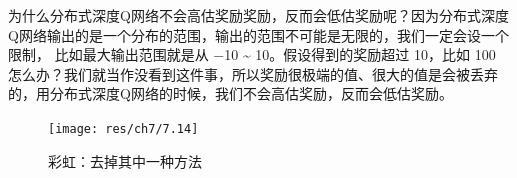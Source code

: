为什么分布式深度Q网络不会高估奖励奖励，反而会低估奖励呢？因为分布式深度Q网络输出的是一个分布的范围，输出的范围不可能是无限的，我们一定会设一个限制， 比如最大输出范围就是从 $-$10 \~{} 10。假设得到的奖励超过 10，比如 100 怎么办？我们就当作没看到这件事，所以奖励很极端的值、很大的值是会被丢弃的，用分布式深度Q网络的时候，我们不会高估奖励，反而会低估奖励。

\begin{figure}[htb]
    \centering
    \texttt{[image: res/ch7/7.14]}
    \caption{彩虹：去掉其中一种方法}
    \label{fig:rainbow_2}
\end{figure}









